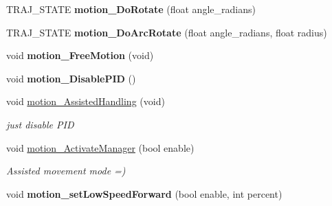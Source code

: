 \begin{DoxyCompactItemize}
\item 
\mbox{\label{classAsservDriver__mbed__i2c_a31be52ac0bbe9f9d761548deb1c86252}} 
T\+R\+A\+J\+\_\+\+S\+T\+A\+TE {\bfseries motion\+\_\+\+Do\+Rotate} (float angle\+\_\+radians)
\item 
\mbox{\label{classAsservDriver__mbed__i2c_a4be26a85247a892da1d4fe2b73d1798e}} 
T\+R\+A\+J\+\_\+\+S\+T\+A\+TE {\bfseries motion\+\_\+\+Do\+Arc\+Rotate} (float angle\+\_\+radians, float radius)
\item 
\mbox{\label{classAsservDriver__mbed__i2c_a35d019875b35e49db97a3e700404e53a}} 
void {\bfseries motion\+\_\+\+Free\+Motion} (void)
\item 
\mbox{\label{classAsservDriver__mbed__i2c_a24eba7a1a351ef4ba2fb41af163feb8c}} 
void {\bfseries motion\+\_\+\+Disable\+P\+ID} ()
\item 
\mbox{\label{classAsservDriver__mbed__i2c_a5b4597c615883c58bbc0c5d649c8a67f}} 
void \hyperlink{classAsservDriver__mbed__i2c_a5b4597c615883c58bbc0c5d649c8a67f}{motion\+\_\+\+Assisted\+Handling} (void)
\begin{DoxyCompactList}\small\item\em just disable P\+ID \end{DoxyCompactList}\item 
\mbox{\label{classAsservDriver__mbed__i2c_a58c64e63be1bbf59fb1a6ab18db1c15e}} 
void \hyperlink{classAsservDriver__mbed__i2c_a58c64e63be1bbf59fb1a6ab18db1c15e}{motion\+\_\+\+Activate\+Manager} (bool enable)
\begin{DoxyCompactList}\small\item\em Assisted movement mode =) \end{DoxyCompactList}\item 
\mbox{\label{classAsservDriver__mbed__i2c_ac160c31f1579eca298e3891b51e0727b}} 
void {\bfseries motion\+\_\+set\+Low\+Speed\+Forward} (bool enable, int percent)
\item 
\mbox{\label{classAsservDriver__mbed__i2c_a6d459bb635686b809447eaaf6e11fa32}} 

\end{DoxyCompactItemize}
